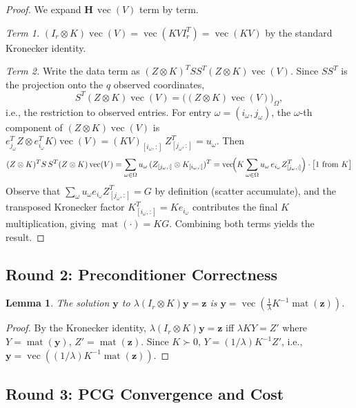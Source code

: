 \documentclass[12pt]{article}
\newtheorem{lemma}[theorem]{Lemma}
\theoremstyle{definition}
\DeclareMathOperator{\vecop}{vec}
\DeclareMathOperator{\mat}{mat}
\newcommand{\bH}{\mathbf{H}}
\newcommand{\bz}{\mathbf{z}}
\begin{document}
\begin{proof}
  We expand $\bH\,\vecop(V)$ term by term.

  \emph{Term 1.}
  $(I_r\otimes K)\vecop(V) = \vecop(KVI_r^T) = \vecop(KV)$ by the standard
  Kronecker identity.

  \emph{Term 2.}  Write the data term as
  $(Z\otimes K)^TSS^T(Z\otimes K)\vecop(V)$.  Since $SS^T$ is the projection
  onto the $q$ observed coordinates,
  \[
    S^T(Z\otimes K)\vecop(V)
    = \bigl((Z\otimes K)\vecop(V)\bigr)_\Omega,
  \]
  i.e., the restriction to observed entries.  For entry $\omega=(i_\omega,j_\omega)$,
  the $\omega$-th component of $(Z\otimes K)\vecop(V)$ is
  $e_{j_\omega}^TZ\otimes e_{i_\omega}^TK)\vecop(V)
   = (KV)_{[i_\omega,:]}\,Z_{[j_\omega,:]}^T = u_\omega$.
  Then
  \[
    (Z\otimes K)^TS\,S^T(Z\otimes K)\vecop(V)
    = \sum_{\omega\in\Omega}u_\omega\,(Z_{[j_\omega,:]}\otimes K_{[i_\omega,:]})^T
    = \vecop\!\Bigl(K\sum_{\omega\in\Omega}u_\omega\,e_{i_\omega}Z_{[j_\omega,:]}^T\Bigr)
    \cdot\bigl[1\text{ from }K\bigr]
  \]
  Observe that $\sum_\omega u_\omega e_{i_\omega}Z_{[j_\omega,:]}^T = G$ by
  definition (scatter accumulate), and the transposed Kronecker factor
  $K_{[i_\omega,:]}^T=Ke_{i_\omega}$ contributes the final $K$ multiplication,
  giving $\mat(\cdot)=KG$.  Combining both terms yields the result.
\end{proof}

\subsection{Round 2: Preconditioner Correctness}

\begin{lemma}\label{lem:precond-solve}
  The solution $\mathbf{y}$ to $\lambda(I_r\otimes K)\mathbf{y}=\bz$ is
  $\mathbf{y}=\vecop(\frac{1}{\lambda}K^{-1}\mat(\bz))$.
\end{lemma}

\begin{proof}
  By the Kronecker identity, $\lambda(I_r\otimes K)\mathbf{y}=\bz$ iff
  $\lambda KY=Z'$ where $Y=\mat(\mathbf{y})$, $Z'=\mat(\bz)$.  Since
  $K\succ 0$, $Y=(1/\lambda)K^{-1}Z'$, i.e.,
  $\mathbf{y}=\vecop((1/\lambda)K^{-1}\mat(\bz))$.
\end{proof}

\subsection{Round 3: PCG Convergence and Cost}
\end{document}
